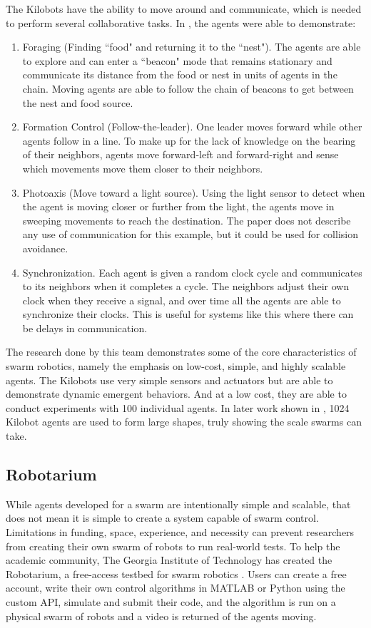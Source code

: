 The Kilobots have the ability to move around and communicate, which is needed to perform several collaborative tasks. In \cite{rubenstein2014kilobot}, the agents were able to demonstrate:
\begin{enumerate}
    \item Foraging (Finding ``food" and returning it to the ``nest"). The agents are able to explore and can enter a ``beacon" mode that remains stationary and communicate its distance from the food or nest in units of agents in the chain. Moving agents are able to follow the chain of beacons to get between the nest and food source.
    \item Formation Control (Follow-the-leader). One leader moves forward while other agents follow in a line. To make up for the lack of knowledge on the bearing of their neighbors, agents move forward-left and forward-right and sense which movements move them closer to their neighbors.
    \item Photoaxis (Move toward a light source). Using the light sensor to detect when the agent is moving closer or further from the light, the agents move in sweeping movements to reach the destination. The paper does not describe any use of communication for this example, but it could be used for collision avoidance.
    \item Synchronization. Each agent is given a random clock cycle and communicates to its neighbors when it completes a cycle. The neighbors adjust their own clock when they receive a signal, and over time all the agents are able to synchronize their clocks. This is useful for systems like this where there can be delays in communication.
\end{enumerate}

The research done by this team demonstrates some of the core characteristics of swarm robotics, namely the emphasis on low-cost, simple, and highly scalable agents. The Kilobots use very simple sensors and actuators but are able to demonstrate dynamic emergent behaviors. And at a low cost, they are able to conduct experiments with 100 individual agents. In later work shown in \cite{rubenstein2014programmable}, 1024 Kilobot agents are used to form large shapes, truly showing the scale swarms can take.
 
\subsection{Robotarium}
\label{sec:robotarium}

While agents developed for a swarm are intentionally simple and scalable, that does not mean it is simple to create a system capable of swarm control. Limitations in funding, space, experience, and necessity can prevent researchers from creating their own swarm of robots to run real-world tests. To help the academic community, The Georgia Institute of Technology has created the Robotarium, a free-access testbed for swarm robotics \cite{wilson2020robotarium}. Users can create a free account, write their own control algorithms in MATLAB or Python using the custom API, simulate and submit their code, and the algorithm is run on a physical swarm of robots and a video is returned of the agents moving. 

